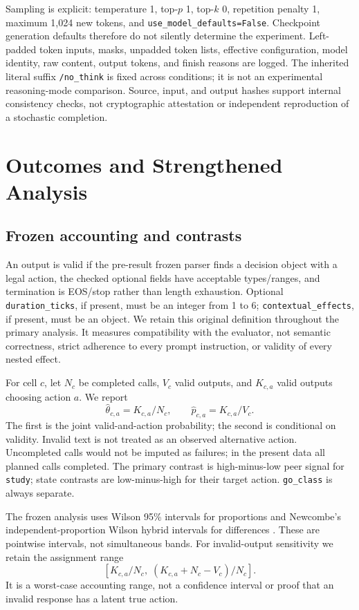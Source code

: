 \documentclass[conference]{IEEEtran}
\newcommand{\code}[1]{\texttt{#1}}
\begin{document}
Sampling is explicit: temperature 1, top-$p$ 1, top-$k$ 0, repetition penalty 1, maximum 1,024 new tokens, and \code{use\_model\_defaults=False}. Checkpoint generation defaults therefore do not silently determine the experiment. Left-padded token inputs, masks, unpadded token lists, effective configuration, model identity, raw content, output tokens, and finish reasons are logged. The inherited literal suffix \code{/no\_think} is fixed across conditions; it is not an experimental reasoning-mode comparison. Source, input, and output hashes support internal consistency checks, not cryptographic attestation or independent reproduction of a stochastic completion.

\section{Outcomes and Strengthened Analysis}
\subsection{Frozen accounting and contrasts}
An output is valid if the pre-result frozen parser finds a decision object with a legal action, the checked optional fields have acceptable types/ranges, and termination is EOS/stop rather than length exhaustion. Optional \code{duration\_ticks}, if present, must be an integer from 1 to 6; \code{contextual\_effects}, if present, must be an object. We retain this original definition throughout the primary analysis. It measures compatibility with the evaluator, not semantic correctness, strict adherence to every prompt instruction, or validity of every nested effect.

For cell $c$, let $N_c$ be completed calls, $V_c$ valid outputs, and $K_{c,a}$ valid outputs choosing action $a$. We report
\begin{equation}
\widehat\theta_{c,a}=K_{c,a}/N_c,\qquad
\widehat p_{c,a}=K_{c,a}/V_c.
\end{equation}
The first is the joint valid-and-action probability; the second is conditional on validity. Invalid text is not treated as an observed alternative action. Uncompleted calls would not be imputed as failures; in the present data all planned calls completed. The primary contrast is high-minus-low peer signal for \code{study}; state contrasts are low-minus-high for their target action. \code{go\_class} is always separate.

The frozen analysis uses Wilson 95\% intervals for proportions and Newcombe's independent-proportion Wilson hybrid intervals for differences \cite{newcombe1998}. These are pointwise intervals, not simultaneous bands. For invalid-output sensitivity we retain the assignment range
\begin{equation}
\left[K_{c,a}/N_c,\;(K_{c,a}+N_c-V_c)/N_c\right].
\end{equation}
It is a worst-case accounting range, not a confidence interval or proof that an invalid response has a latent true action.
\end{document}
